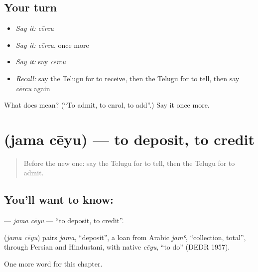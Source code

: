 \subsection*{Your turn}
\begin{itemize}
\raggedright
  \item \emph{Say it:} \emph{cērcu}
  \item \emph{Say it:} \emph{cērcu}, once more
  \item \emph{Say it:} say \emph{cērcu}
  \item \emph{Recall:} say the Telugu for to receive, then the Telugu for to tell, then say \emph{cērcu} again
\end{itemize}

\begin{tcolorbox}[breakable,colback=teal!4,colframe=teal!35!black,title={Before you move on}]
What does  mean? (\textquotedblleft{}To admit, to enrol, to add\textquotedblright{}.) Say it once more.
\end{tcolorbox}
\section[\texorpdfstring{\te{జమ} \te{చేయు} (jama cēyu)}{జమ చేయు (jama cēyu)}]{  (jama cēyu) — to deposit, to credit}

\label{lesson:TE-C280-jama-ceyu}



\begin{quote}
Before the new one: say the Telugu for to tell, then the Telugu for to admit.
\end{quote}

\subsection*{You'll want to know:  }
\textbf{ } — \emph{jama cēyu} — \textquotedblleft{}to deposit, to credit\textquotedblright{}.

\begin{cousinweb}
\textbf{ } (\emph{jama cēyu}) pairs \emph{jama}, \textquotedblleft{}deposit\textquotedblright{}, a loan from Arabic \emph{jamʿ}, \textquotedblleft{}collection, total\textquotedblright{}, through Persian and Hindustani, with native \emph{cēyu}, \textquotedblleft{}to do\textquotedblright{} (DEDR 1957).
\end{cousinweb}

\begin{grammarlens}[title={What you've built}]
One more word for this chapter.
\end{grammarlens}


